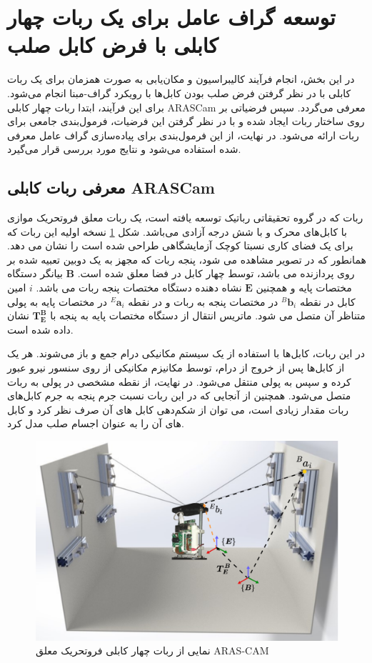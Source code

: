 \section{توسعه گراف عامل برای یک ربات چهار کابلی با فرض کابل صلب}
در این بخش، انجام فرآیند کالیبراسیون و مکان‌یابی به صورت همزمان برای یک ربات کابلی با در نظر گرفتن فرض صلب بودن کابل‌ها با رویکرد گراف-مبنا انجام می‌شود. برای این فرآیند، ابتدا ربات چهار کابلی ARASCam معرفی می‌گردد. سپس فرضیاتی بر روی ساختار ربات ایجاد شده و با در نظر گرفتن این فرضیات، فرمول‌بندی جامعی برای ربات ارائه می‌شود. در نهایت، از این فرمول‌بندی برای پیاده‌سازی گراف عامل معرفی شده استفاده می‌شود و نتایج مورد بررسی قرار می‌گیرد. 

\subsection{معرفی ربات کابلی ARASCam}
ربات  که در گروه تحقیقاتی رباتیک  توسعه یافته است، یک ربات معلق فروتحریک موازی با کابل‌های محرک و با شش درجه آزادی می‌باشد. شکل 
\ref{fig:arascam}
 نسخه اولیه این  ربات که برای یک فضای کاری نسبتا کوچک آزمایشگاهی طراحی شده است را نشان می دهد. همانطور که در تصویر مشاهده می شود، پنجه ربات که مجهز به یک دوبین تعبیه شده بر روی پردازنده 
می باشد، توسط چهار کابل در فضا معلق شده است. $\boldsymbol{B}$ بیانگر دستگاه مختصات پایه و همچنین $\boldsymbol{E}$ نشاه دهنده دستگاه مختصات پنجه ربات می باشد. $i$ امین کابل در نقطه ${}^B\!\boldsymbol{b}_i$ در مختصات پنجه به ربات و در نقطه ${}^E\!\boldsymbol{a}_i$ در مختصات پایه به پولی متناظر آن متصل می شود. ماتریس انتقال از دستگاه مختصات پایه به پنجه با 
$\boldsymbol{T}^{\boldsymbol{B}}_{\boldsymbol{E}}$
نشان داده شده است.


در این ربات، کابل‌ها با استفاده از یک سیستم مکانیکی درام جمع و باز می‌شوند. هر یک از کابل‌ها پس از خروج از درام، توسط مکانیزم مکانیکی از روی سنسور نیرو عبور کرده و سپس به پولی منتقل می‌شود. در نهایت، از نقطه مشخصی در پولی به ربات متصل می‌شود. همچنین از آنجایی که در این ربات نسبت جرم پنجه به جرم کابل‌های ربات مقدار زیادی است، می توان از شکم‌دهی کابل های آن صرف نظر کرد و کابل های آن را به عنوان اجسام صلب مدل کرد.

\begin{figure}
	\centering
	\includegraphics[width=0.5\linewidth]{img/arascam}
	\caption{نمایی از ربات چهار کابلی فروتحریک معلق ARAS-CAM}
	\label{fig:arascam}
\end{figure}

